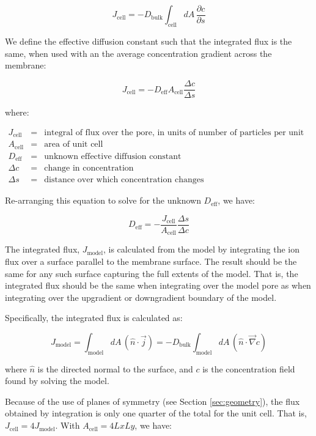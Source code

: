 \documentclass{article}
\begin{document}
$$J_{\text{cell}} = - D_{\text{bulk}}\int_{\text{cell}} dA\, \frac{\partial c}{\partial s}$$

We define the effective diffusion constant such that the integrated flux is the same,
when used with an the average concentration gradient across the membrane:

$$J_{\text{cell}} = - D_{\text{eff}} A_{\text{cell}} \frac{\Delta c}{\Delta s}$$

where:

$\begin{array}{rcl}
J_{\text{cell}} & = & \text{integral of flux over the pore, in units of number of particles per unit time} \\
A_{\text{cell}} & = & \text{area of unit cell} \\
D_{\text{eff}} & = & \text{unknown effective diffusion constant} \\
\Delta c & = & \text{change in concentration} \\
\Delta s & = & \text{distance over which concentration changes}
\end{array}$

Re-arranging this equation to solve for the unknown $D_{\text{eff}}$, we have:

$$D_{\text{eff}} = - \frac{J_{\text{cell}}}{A_{\text{cell}}} \frac{\Delta s}{\Delta c}$$

The integrated flux, $J_{\text{model}}$, is calculated from the model by integrating
the ion flux over a surface parallel to the membrane surface.
The result should be the same for any such surface capturing the full extents of the model.
That is, the integrated flux should be the same when integrating over the model pore as
when integrating over the upgradient or downgradient boundary of the model.

Specifically, the integrated flux is calculated as:

$$J_{\text{model}} = \int_{\text{model}} dA\, \left(\hat{n} \cdot \vec{j} \right)
 = - D_{\text{bulk}} \int_{\text{model}} dA\, \left(\hat{n} \cdot \vec{\nabla} c \right)$$

where $\hat{n}$ is the directed normal to the surface,
and $c$ is the concentration field found by solving the model.

Because of the use of planes of symmetry (see Section \ref{sec:geometry}),
the flux obtained by integration is only one quarter of the total for the unit cell.
That is, $J_{\text{cell}} = 4 J_{\text{model}}$.
With $A_{\text{cell}} = 4 Lx Ly$, we have:
\end{document}
